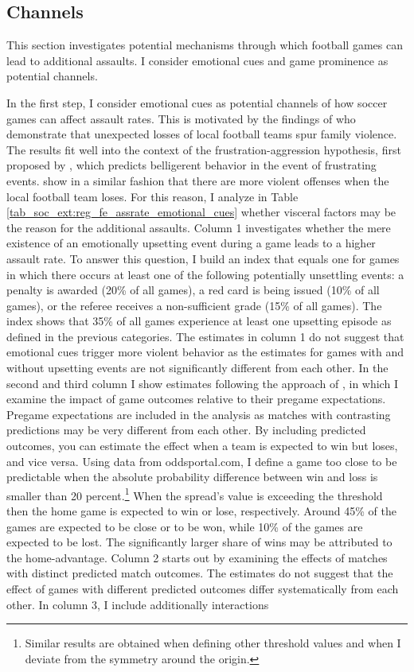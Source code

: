 \documentclass[11pt, a4paper]{article} %
\begin{document}
\subsection{Channels}
This section investigates potential mechanisms through which football games can lead to additional assaults. I consider emotional cues and game prominence as potential channels.


In the first step, I consider emotional cues as potential channels of how soccer games can affect assault rates. This is motivated by the findings of \cite{card2011family} who demonstrate that unexpected losses of local football teams spur family violence. The results fit well into the context of the frustration-aggression hypothesis, first proposed by \cite{dollard1939frustration}, which predicts belligerent behavior in the event of frustrating events. \cite{rees2009college} show in a similar fashion that there are more violent offenses when the local football team loses. For this reason, I analyze in Table \ref{tab_soc_ext:reg_fe_assrate_emotional_cues} whether visceral factors may be the reason for the additional assaults. Column 1 investigates whether the mere existence of an emotionally upsetting event during a game leads to a higher assault rate. To answer this question, I build an index that equals one for games in which there occurs at least one of the following potentially unsettling events: a penalty is awarded (20\% of all games), a red card is being issued (10\% of all games), or the referee receives a non-sufficient grade (15\% of all games). The index shows that 35\% of all games experience at least one upsetting episode as defined in the previous categories. The estimates in column 1 do not suggest that emotional cues trigger more violent behavior as the estimates for games with and without upsetting events are not significantly different from each other. 	In the second and third column I show estimates following the approach of \cite{card2011family}, in which I examine the impact of game outcomes relative to their pregame expectations. Pregame expectations are included in the analysis as matches with contrasting predictions may be very different from each other. By including predicted outcomes, you can estimate the effect when a team is expected to win but loses, and vice versa. Using data from oddsportal.com, I define a game too close to be predictable when the absolute probability difference between win and loss is smaller than 20 percent.\footnote{Similar results are obtained when defining other threshold values and when I deviate from the symmetry around the origin.} When the spread's value is exceeding the threshold then the home game is expected to win or lose, respectively. Around 45\% of the games are expected to be close or to be won, while 10\% of the games are expected to be lost. The significantly larger share of wins may be attributed to the home-advantage. Column 2 starts out by examining the effects of matches with distinct predicted match outcomes. The estimates do not suggest that the effect of games with different predicted outcomes differ systematically from each other. In column 3, I include additionally interactions 
\end{document}
